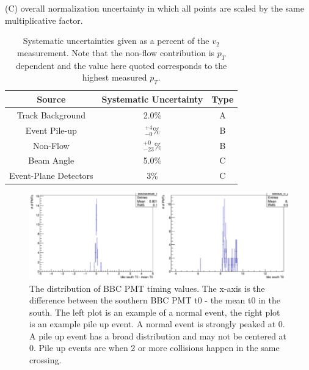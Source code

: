 (C) overall normalization uncertainty in which all points are scaled by the same multiplicative factor.

\begin{table}[!h]
  \begin{center}
  \caption{\label{t:sys}Systematic uncertainties given as a percent of the $v_2$ measurement. Note that the non-flow contribution is $p_T$ dependent and the value here quoted corresponds to the highest measured $p_T$.}
    \begin{tabular}{ccc}
      \hline
      \hline
      Source& Systematic Uncertainty & Type \\ \hline
      Track Background &2.0\%& A\\ 
      Event Pile-up    &$^{+4}_{-0}\%$& B\\
      Non-Flow    &$^{+0}_{-23}\%$& B\\
      Beam Angle &5.0\%& C\\  
      Event-Plane Detectors & 3\% & C\\
    \hline
    \hline
    \end{tabular}
   \end{center}
 \end{table}

\begin{figure}[!h]
\begin{center}
\includegraphics[width=0.8\linewidth]{figs/example_pile_up_event.png}
\caption{The distribution of BBC PMT timing values. The x-axis is the difference between the southern BBC PMT t0 - the mean t0 in the south. The left plot is an example of a normal event, the right plot is an example pile up event. A normal event is strongly peaked at 0. A pile up event has a broad distribution and may not be centered at 0. Pile up events are when 2 or more collisions happen in the same crossing.}
\label{fig:pile_up_example}
\end{center}
\end{figure}

